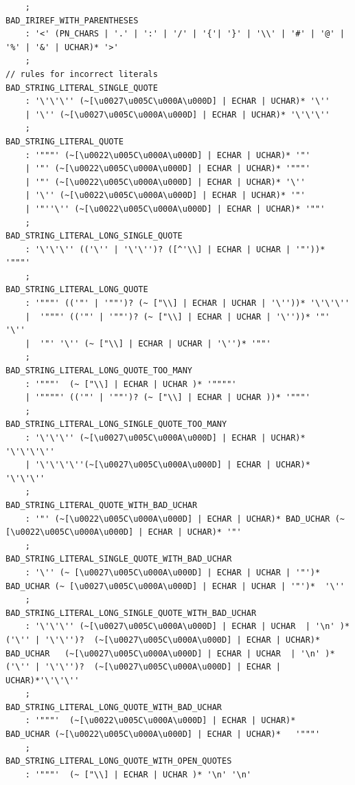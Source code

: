 \begin{appendices}
\begin{lstlisting}
	;
BAD_IRIREF_WITH_PARENTHESES 
    : '<' (PN_CHARS | '.' | ':' | '/' | '{'| '}' | '\\' | '#' | '@' | '%' | '&' | UCHAR)* '>'
	;
// rules for incorrect literals
BAD_STRING_LITERAL_SINGLE_QUOTE   
    : '\'\'\'' (~[\u0027\u005C\u000A\u000D] | ECHAR | UCHAR)* '\'' 
	| '\'' (~[\u0027\u005C\u000A\u000D] | ECHAR | UCHAR)* '\'\'\'' 
	;
BAD_STRING_LITERAL_QUOTE      
	: '"""' (~[\u0022\u005C\u000A\u000D] | ECHAR | UCHAR)* '"' 
	| '"' (~[\u0022\u005C\u000A\u000D] | ECHAR | UCHAR)* '"""' 
	| '"' (~[\u0022\u005C\u000A\u000D] | ECHAR | UCHAR)* '\'' 
	| '\'' (~[\u0022\u005C\u000A\u000D] | ECHAR | UCHAR)* '"' 	
	| '"''\'' (~[\u0022\u005C\u000A\u000D] | ECHAR | UCHAR)* '""' 			
	;  	  
BAD_STRING_LITERAL_LONG_SINGLE_QUOTE
	: '\'\'\'' (('\'' | '\'\'')? ([^'\\] | ECHAR | UCHAR | '"'))* '"""'
	;
BAD_STRING_LITERAL_LONG_QUOTE
	: '"""' (('"' | '""')? (~ ["\\] | ECHAR | UCHAR | '\''))* '\'\'\''
	|  '"""' (('"' | '""')? (~ ["\\] | ECHAR | UCHAR | '\''))* '"' '\''
	|  '"' '\'' (~ ["\\] | ECHAR | UCHAR | '\'')* '""'
	;
BAD_STRING_LITERAL_LONG_QUOTE_TOO_MANY
	: '"""'  (~ ["\\] | ECHAR | UCHAR )* '""""'
	| '""""' (('"' | '""')? (~ ["\\] | ECHAR | UCHAR ))* '"""' 
	;	
BAD_STRING_LITERAL_LONG_SINGLE_QUOTE_TOO_MANY
	: '\'\'\'' (~[\u0027\u005C\u000A\u000D] | ECHAR | UCHAR)*  '\'\'\'\''
	| '\'\'\'\''(~[\u0027\u005C\u000A\u000D] | ECHAR | UCHAR)*  '\'\'\''
	;
BAD_STRING_LITERAL_QUOTE_WITH_BAD_UCHAR
    : '"' (~[\u0022\u005C\u000A\u000D] | ECHAR | UCHAR)* BAD_UCHAR (~[\u0022\u005C\u000A\u000D] | ECHAR | UCHAR)* '"' 
    ;
BAD_STRING_LITERAL_SINGLE_QUOTE_WITH_BAD_UCHAR
    : '\'' (~ [\u0027\u005C\u000A\u000D] | ECHAR | UCHAR | '"')*  BAD_UCHAR (~ [\u0027\u005C\u000A\u000D] | ECHAR | UCHAR | '"')*  '\''
    ;
BAD_STRING_LITERAL_LONG_SINGLE_QUOTE_WITH_BAD_UCHAR
    : '\'\'\'' (~[\u0027\u005C\u000A\u000D] | ECHAR | UCHAR  | '\n' )*  ('\'' | '\'\'')?  (~[\u0027\u005C\u000A\u000D] | ECHAR | UCHAR)* BAD_UCHAR   (~[\u0027\u005C\u000A\u000D] | ECHAR | UCHAR  | '\n' )*  ('\'' | '\'\'')?  (~[\u0027\u005C\u000A\u000D] | ECHAR | UCHAR)*'\'\'\''  
    ;
BAD_STRING_LITERAL_LONG_QUOTE_WITH_BAD_UCHAR
    : '"""'  (~[\u0022\u005C\u000A\u000D] | ECHAR | UCHAR)*   BAD_UCHAR (~[\u0022\u005C\u000A\u000D] | ECHAR | UCHAR)*   '"""'
    ;
BAD_STRING_LITERAL_LONG_QUOTE_WITH_OPEN_QUOTES
    : '"""'  (~ ["\\] | ECHAR | UCHAR )* '\n' '\n'

\end{lstlisting}
\end{appendices}
